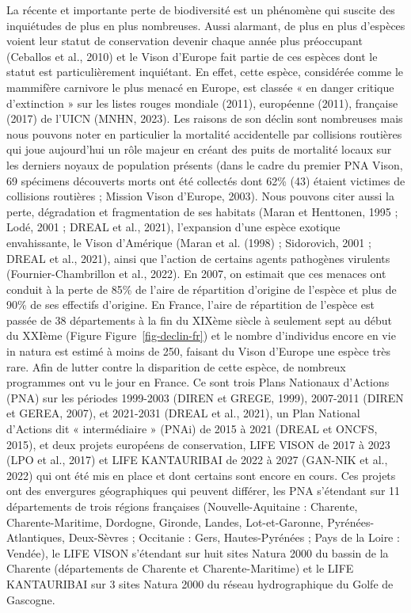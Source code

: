 \documentclass[
  letterpaper,
  DIV=11,
  numbers=noendperiod]{scrreprt}
\begin{document}
La récente et importante perte de biodiversité est un phénomène qui
suscite des inquiétudes de plus en plus nombreuses. Aussi alarmant, de
plus en plus d'espèces voient leur statut de conservation devenir chaque
année plus préoccupant (Ceballos et al., 2010) et le Vison d'Europe fait
partie de ces espèces dont le statut est particulièrement inquiétant. En
effet, cette espèce, considérée comme le mammifère carnivore le plus
menacé en Europe, est classée « en danger critique d'extinction » sur
les listes rouges mondiale (2011), européenne (2011), française (2017)
de l'UICN (MNHN, 2023). Les raisons de son déclin sont nombreuses mais
nous pouvons noter en particulier la mortalité accidentelle par
collisions routières qui joue aujourd'hui un rôle majeur en créant des
puits de mortalité locaux sur les derniers noyaux de population présents
(dans le cadre du premier PNA Vison, 69 spécimens découverts morts ont
été collectés dont 62\% (43) étaient victimes de collisions routières ;
Mission Vison d'Europe, 2003). Nous pouvons citer aussi la perte,
dégradation et fragmentation de ses habitats (Maran et Henttonen, 1995 ;
Lodé, 2001 ; DREAL et al., 2021), l'expansion d'une espèce exotique
envahissante, le Vison d'Amérique (Maran et al. (1998) ; Sidorovich,
2001 ; DREAL et al., 2021), ainsi que l'action de certains agents
pathogènes virulents (Fournier-Chambrillon et al., 2022). En 2007, on
estimait que ces menaces ont conduit à la perte de 85\% de l'aire de
répartition d'origine de l'espèce et plus de 90\% de ses effectifs
d'origine. En France, l'aire de répartition de l'espèce est passée de 38
départements à la fin du XIXème siècle à seulement sept au début du
XXIème (Figure Figure~\ref{fig-declin-fr}) et le nombre d'individus
encore en vie in natura est estimé à moins de 250, faisant du Vison
d'Europe une espèce très rare. Afin de lutter contre la disparition de
cette espèce, de nombreux programmes ont vu le jour en France. Ce sont
trois Plans Nationaux d'Actions (PNA) sur les périodes 1999-2003 (DIREN
et GREGE, 1999), 2007-2011 (DIREN et GEREA, 2007), et 2021-2031 (DREAL
et al., 2021), un Plan National d'Actions dit « intermédiaire » (PNAi)
de 2015 à 2021 (DREAL et ONCFS, 2015), et deux projets européens de
conservation, LIFE VISON de 2017 à 2023 (LPO et al., 2017) et LIFE
KANTAURIBAI de 2022 à 2027 (GAN-NIK et al., 2022) qui ont été mis en
place et dont certains sont encore en cours. Ces projets ont des
envergures géographiques qui peuvent différer, les PNA s'étendant sur 11
départements de trois régions françaises (Nouvelle-Aquitaine : Charente,
Charente-Maritime, Dordogne, Gironde, Landes, Lot-et-Garonne,
Pyrénées-Atlantiques, Deux-Sèvres ; Occitanie : Gers, Hautes-Pyrénées ;
Pays de la Loire : Vendée), le LIFE VISON s'étendant sur huit sites
Natura 2000 du bassin de la Charente (départements de Charente et
Charente-Maritime) et le LIFE KANTAURIBAI sur 3 sites Natura 2000 du
réseau hydrographique du Golfe de Gascogne.
\end{document}
